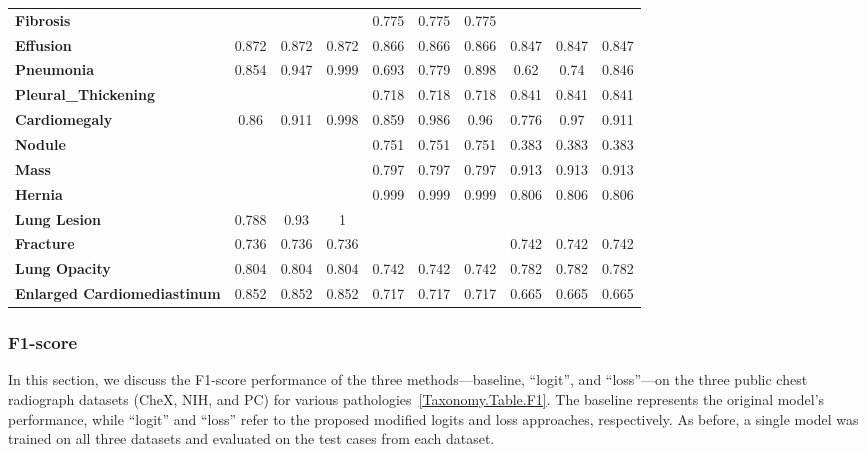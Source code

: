 \documentclass[preprint,3p,times, review]{elsarticle}
\begin{document}
\begin{table}[]
{\begin{tabular}{lccccccccc}
\textbf{Fibrosis}                     &           &           &           & 0.775     & 0.775     & 0.775    &           &          &          \\
\textbf{Effusion}                     & 0.872     & 0.872     & 0.872     & 0.866     & 0.866     & 0.866    & 0.847     & 0.847    & 0.847    \\
\textbf{Pneumonia}                    & 0.854     & 0.947     & 0.999     & 0.693     & 0.779     & 0.898    & 0.62      & 0.74     & 0.846    \\
\textbf{Pleural\_Thickening}          &           &           &           & 0.718     & 0.718     & 0.718    & 0.841     & 0.841    & 0.841    \\
\textbf{Cardiomegaly}                 & 0.86      & 0.911     & 0.998     & 0.859     & 0.986     & 0.96     & 0.776     & 0.97     & 0.911    \\
\textbf{Nodule}                       &           &           &           & 0.751     & 0.751     & 0.751    & 0.383     & 0.383    & 0.383    \\
\textbf{Mass}                         &           &           &           & 0.797     & 0.797     & 0.797    & 0.913     & 0.913    & 0.913    \\
\textbf{Hernia}                       &           &           &           & 0.999     & 0.999     & 0.999    & 0.806     & 0.806    & 0.806    \\
\textbf{Lung Lesion}                  & 0.788     & 0.93      & 1         &           &           &          &           &          &          \\
\textbf{Fracture}                     & 0.736     & 0.736     & 0.736     &           &           &          & 0.742     & 0.742    & 0.742    \\
\textbf{Lung Opacity}                 & 0.804     & 0.804     & 0.804     & 0.742     & 0.742     & 0.742    & 0.782     & 0.782    & 0.782    \\
\textbf{Enlarged   Cardiomediastinum} & 0.852     & 0.852     & 0.852     & 0.717     & 0.717     & 0.717    & 0.665     & 0.665    & 0.665
\end{tabular}%
}\label{Taxonomy.Table.AUC_default}
\end{table}

\subsubsection*{F1-score}
In this section, we discuss the F1-score performance of the three methods---baseline, ``logit'', and ``loss''---on the three public chest radiograph datasets (CheX, NIH, and PC) for various pathologies~\ref{Taxonomy.Table.F1}. The baseline represents the original model's performance, while ``logit'' and ``loss'' refer to the proposed modified logits and loss approaches, respectively. As before, a single model was trained on all three datasets and evaluated on the test cases from each dataset.
\end{document}
